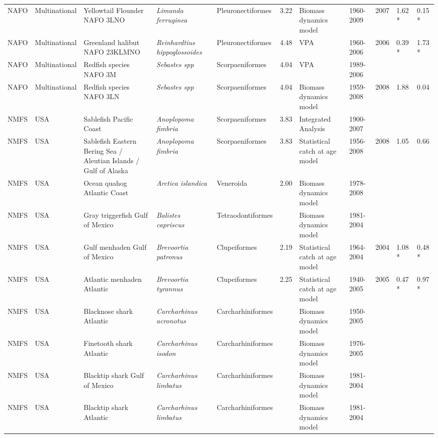 \begin{longtable}{p{1.5cm}p{1.5cm}p{3cm}p{3cm}p{2.5cm}p{0.9cm}p{1.4cm}p{0.9cm}p{0.9cm}p{0.9cm}p{1cm}}
  NAFO & Multinational & Yellowtail Flounder NAFO 3LNO & \textit{Limanda ferruginea} & Pleuronectiformes & 3.22 & Biomass dynamics model & 1960-2009 & 2007 & 1.62 * & 0.15 * \\ 
  NAFO & Multinational & Greenland halibut NAFO 23KLMNO & \textit{Reinhardtius hippoglossoides} & Pleuronectiformes & 4.48 & VPA & 1960-2006 & 2006 & 0.39 * & 1.73 * \\ 
  NAFO & Multinational & Redfish species NAFO 3M & \textit{Sebastes spp} & Scorpaeniformes & 4.04 & VPA & 1989-2006 &  &  &  \\ 
  NAFO & Multinational & Redfish species NAFO 3LN & \textit{Sebastes spp} & Scorpaeniformes & 4.04 & Biomass dynamics model & 1959-2008 & 2008 & 1.88 & 0.04 \\ 
  NMFS & USA & Sablefish Pacific Coast & \textit{Anoplopoma fimbria} & Scorpaeniformes & 3.83 & Integrated Analysis & 1900-2007 &  &  &  \\ 
  NMFS & USA & Sablefish Eastern Bering Sea / Aleutian Islands / Gulf of Alaska & \textit{Anoplopoma fimbria} & Scorpaeniformes & 3.83 & Statistical catch at age model & 1956-2008 & 2008 & 1.05 & 0.66 \\ 
  NMFS & USA & Ocean quahog Atlantic Coast & \textit{Arctica islandica} & Veneroida & 2.00 & Biomass dynamics model & 1978-2008 &  &  &  \\ 
  NMFS & USA & Gray triggerfish Gulf of Mexico & \textit{Balistes capriscus} & Tetraodontiformes &  & Biomass dynamics model & 1981-2004 &  &  &  \\ 
  NMFS & USA & Gulf menhaden Gulf of Mexico & \textit{Brevoortia patronus} & Clupeiformes & 2.19 & Statistical catch at age model & 1964-2004 & 2004 & 1.08 * & 0.48 * \\ 
  NMFS & USA & Atlantic menhaden Atlantic & \textit{Brevoortia tyrannus} & Clupeiformes & 2.25 & Statistical catch at age model & 1940-2005 & 2005 & 0.47 * & 0.97 * \\ 
  NMFS & USA & Blacknose shark Atlantic & \textit{Carcharhinus acronotus} & Carcharhiniformes &  & Biomass dynamics model & 1950-2005 &  &  &  \\ 
  NMFS & USA & Finetooth shark Atlantic & \textit{Carcharhinus isodon} & Carcharhiniformes &  & Biomass dynamics model & 1976-2005 &  &  &  \\ 
  NMFS & USA & Blacktip shark Gulf of Mexico & \textit{Carcharhinus limbatus} & Carcharhiniformes &  & Biomass dynamics model & 1981-2004 &  &  &  \\ 
  NMFS & USA & Blacktip shark Atlantic & \textit{Carcharhinus limbatus} & Carcharhiniformes &  & Biomass dynamics model & 1981-2004 &  &  &  \\ 

\end{longtable}
